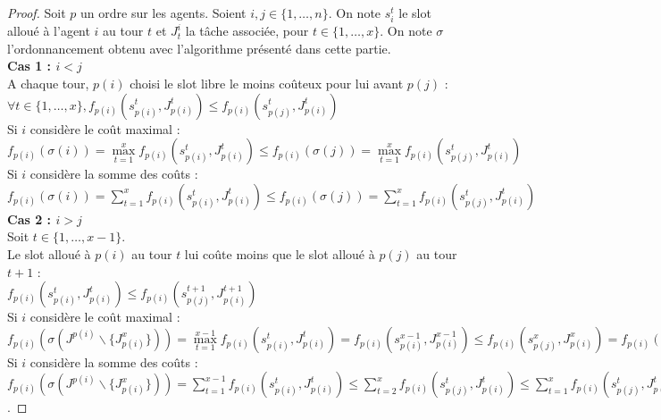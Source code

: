 \documentclass[12pt]{article}
\theoremstyle{definition}
\begin{document}
\begin{proof}
Soit $p$ un ordre sur les agents. Soient $i, j \in \{1, \dots, n\}$. On note $s_i^t$ le slot alloué à l'agent $i$ au tour $t$ et $J^i_t$ la tâche associée, pour $t\in\{1,\dots,x\}$. On note $\sigma$ l'ordonnancement obtenu avec l'algorithme présenté dans cette partie.\\
\textbf{Cas 1 : $i<j$}\\
A chaque tour, $p(i)$ choisi le slot libre le moins coûteux pour lui avant $p(j)$ :\\
 $\forall t\in \{1, \dots, x\}, f_{p(i)}(s^t_{p(i)}, J^t_{p(i)})\leq f_{p(i)}(s^t_{p(j)}, J^t_{p(i)})$\\
 Si $i$ considère le coût maximal : $f_{p(i)}(\sigma(i)) = \max\limits_{t = 1}^x f_{p(i)}(s^t_{p(i)}, J^t_{p(i)}) \leq f_{p(i)}(\sigma(j)) = \max\limits_{t = 1}^x f_{p(i)}(s^t_{p(j)}, J^t_{p(i)})$\\
 Si $i$ considère la somme des coûts : $f_{p(i)}(\sigma(i)) = \sum\limits_{t = 1}^x f_{p(i)}(s^t_{p(i)}, J^t_{p(i)})\leq f_{p(i)}(\sigma(j)) = \sum\limits_{t = 1}^x f_{p(i)}(s^t_{p(j)}, J^t_{p(i)})$\\
\textbf{Cas 2 : $i>j$}\\
Soit $t\in\{1,\dots,x-1\}$.\\
Le slot alloué à $p(i)$ au tour $t$ lui coûte moins que le slot alloué à $p(j)$ au tour $t+1$ : \\
$f_{p(i)}(s^t_{p(i)}, J^t_{p(i)})\leq f_{p(i)}(s^{t+1}_{p(j)}, J^{t+1}_{p(i)})$\\
Si $i$ considère le coût maximal : \\
$f_{p(i)}(\sigma(J^{p(i)}\backslash\{J_{p(i)}^x\})) = \max\limits_{t = 1}^{x-1} f_{p(i)}(s^t_{p(i)}, J^t_{p(i)}) = f_{p(i)}(s^{x-1}_{p(i)}, J^{x-1}_{p(i)}) \leq f_{p(i)}(s^x_{p(j)}, J^x_{p(i)}) = f_{p(i)}(\sigma(j))$\\
Si $i$ considère la somme des coûts : \\
$f_{p(i)}(\sigma(J^{p(i)}\backslash\{J_{p(i)}^x\})) = \sum\limits_{t = 1}^{x-1} f_{p(i)}(s^t_{p(i)}, J^t_{p(i)}) \leq \sum\limits_{t = 2}^{x} f_{p(i)}(s^t_{p(j)}, J^t_{p(i)}) \leq \sum\limits_{t = 1}^{x} f_{p(i)}(s^t_{p(j)}, J^t_{p(i)}) = f_{p(i)}(\sigma(j))$.
\end{proof}
\end{document}
